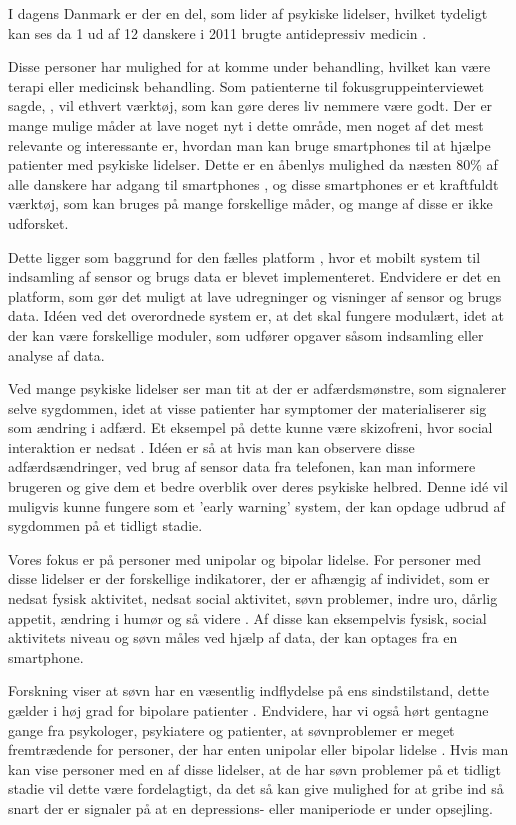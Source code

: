 I dagens Danmark er der en del, som lider af psykiske lidelser, hvilket tydeligt kan ses da 1 ud af 12 danskere i 2011 brugte antidepressiv medicin \citep{misc:forbrugAntidepressiva}. 

Disse personer har mulighed for at komme under behandling, hvilket kan være terapi eller medicinsk behandling.
Som patienterne til fokusgruppeinterviewet sagde, \citep[Kapitel 1, Sektion 5]{misc:faellesrapp}, vil ethvert værktøj, som kan gøre deres liv nemmere være godt.
Der er mange mulige måder at lave noget nyt i dette område, men noget af det mest relevante og interessante er, hvordan man kan bruge smartphones til at hjælpe patienter med psykiske lidelser.
Dette er en åbenlys mulighed da næsten 80\% af alle danskere har adgang til smartphones \citep{misc:dstElektronik}, og disse smartphones er et kraftfuldt værktøj, som kan bruges på mange forskellige måder, og mange af disse er ikke udforsket.

Dette ligger som baggrund for den fælles platform \citep{misc:faellesrapp}, hvor et mobilt system til indsamling af sensor og brugs data er blevet implementeret. 
Endvidere er det en platform, som gør det muligt at lave udregninger og visninger af sensor og brugs data.
Idéen ved det overordnede system er, at det skal fungere modulært, idet at der kan være forskellige moduler, som udfører opgaver såsom indsamling eller analyse af data.

Ved mange psykiske lidelser ser man tit at der er adfærdsmønstre, som signalerer selve sygdommen, idet at visse patienter har symptomer der materialiserer sig som ændring i adfærd.
Et eksempel på dette kunne være skizofreni, hvor social interaktion er nedsat \citep{misc:negativeSymptomsSchizo}.
Idéen er så at hvis man kan observere disse adfærdsændringer, ved brug af sensor data fra telefonen, kan man informere brugeren og give dem et bedre overblik over deres psykiske helbred.
Denne idé vil muligvis kunne fungere som et 'early warning' system, der kan opdage udbrud af sygdommen på et tidligt stadie.

Vores fokus er på personer med unipolar og bipolar lidelse. 
For personer med disse lidelser er der forskellige indikatorer, der er afhængig af individet, som er nedsat fysisk aktivitet, nedsat social aktivitet, søvn problemer, indre uro, dårlig appetit, ændring i humør og så videre \citep{misc:faellesrapp}.
Af disse kan eksempelvis fysisk, social aktivitets niveau og søvn måles ved hjælp af data, der kan optages fra en smartphone.

Forskning viser at søvn har en væsentlig indflydelse på ens sindstilstand, dette gælder i høj grad for bipolare patienter \citep{CPSP:CPSP1164}.
Endvidere, har vi også hørt gentagne gange fra psykologer, psykiatere og patienter, at søvnproblemer er meget fremtrædende for personer, der har enten unipolar eller bipolar lidelse \citep[Kapitel 2, Sektion 3,4,5]{misc:faellesrapp}.
Hvis man kan vise personer med en af disse lidelser, at de har søvn problemer på et tidligt stadie vil dette være fordelagtigt, da det så kan give mulighed for at gribe ind så snart der er signaler på at en depressions- eller maniperiode er under opsejling.

